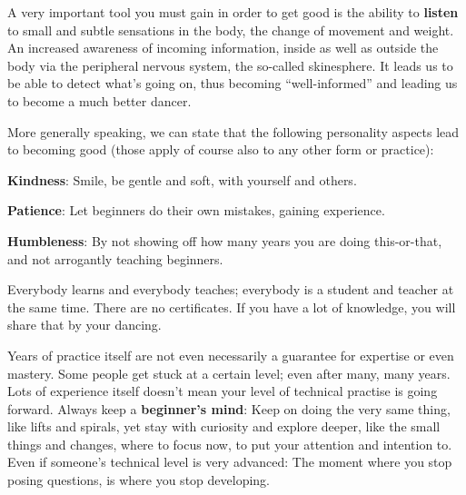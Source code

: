 A very important tool you must gain in order to get good is the ability to \textbf{listen} to small and subtle sensations in the body, the change of movement and weight.
An increased awareness of incoming information, inside as well as outside the body via the peripheral nervous system, the so-called \gls{skinesphere}.
It leads us to be able to detect what's going on, thus becoming ``well-informed'' and leading us to become a much better dancer.

More generally speaking, we can state that the following personality aspects lead to becoming good (those apply of course also to any other form or practice):

\begin{itemize*}
    \item [] \textbf{Kindness}: Smile, be gentle and soft, with yourself and others.
    \item [] \textbf{Patience}: Let beginners do their own mistakes, gaining experience.
    \item [] \textbf{Humbleness}: By not showing off how many years you are doing this-or-that, and not arrogantly teaching beginners.
\end{itemize*}

Everybody learns and everybody teaches; everybody is a student and teacher at the same time.
There are no certificates.
If you have a lot of knowledge, you will share that by your dancing.

Years of practice itself are not even necessarily a guarantee for expertise or even mastery.
Some people get stuck at a certain level; even after many, many years.
Lots of experience itself doesn't mean your level of technical practise is going forward.
Always keep a \textbf{beginner's mind}: Keep on doing the very same thing, like lifts and spirals, yet stay with curiosity and explore deeper, like the small things and changes, where to focus now, to put your attention and intention to.
Even if someone's technical level is very advanced: The moment where you stop posing questions, is where you stop developing.